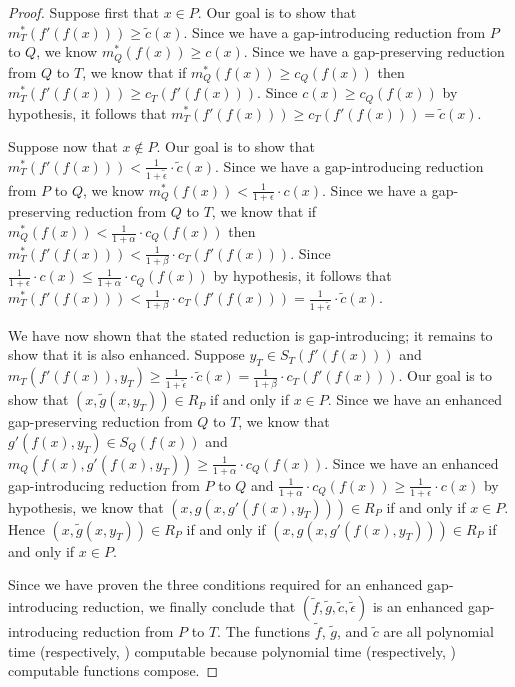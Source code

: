 \documentclass[]{article}
\begin{document}
\begin{proof}
  Suppose first that $x \in P$.
  Our goal is to show that $m^*_T(f'(f(x))) \geq \tilde{c}(x)$.
  Since we have a gap-introducing reduction from $P$ to $Q$, we know $m^*_Q(f(x)) \geq c(x)$.
  Since we have a gap-preserving reduction from $Q$ to $T$, we know that if $m^*_Q(f(x)) \geq c_Q(f(x))$ then $m^*_T(f'(f(x))) \geq c_T(f'(f(x)))$.
  Since $c(x) \geq c_Q(f(x))$ by hypothesis, it follows that $m^*_T(f'(f(x))) \geq c_T(f'(f(x))) = \tilde{c}(x)$.

  Suppose now that $x \notin P$.
  Our goal is to show that $m^*_T(f'(f(x))) < \frac{1}{1 + \tilde{\epsilon}} \cdot \tilde{c}(x)$.
  Since we have a gap-introducing reduction from $P$ to $Q$, we know $m^*_Q(f(x)) < \frac{1}{1 + \epsilon} \cdot c(x)$.
  Since we have a gap-preserving reduction from $Q$ to $T$, we know that if $m^*_Q(f(x)) < \frac{1}{1 + \alpha} \cdot c_Q(f(x))$ then $m^*_T(f'(f(x))) < \frac{1}{1 + \beta} \cdot c_T(f'(f(x)))$.
  Since $\frac{1}{1 + \epsilon} \cdot c(x) \leq \frac{1}{1 + \alpha} \cdot c_Q(f(x))$ by hypothesis, it follows that $m^*_T(f'(f(x))) < \frac{1}{1 + \beta} \cdot c_T(f'(f(x))) = \frac{1}{1 + \tilde{\epsilon}} \cdot \tilde{c}(x)$.

  We have now shown that the stated reduction is gap-introducing; it remains to show that it is also enhanced.
  Suppose $y_T \in S_T(f'(f(x)))$ and $m_T(f'(f(x)), y_T) \geq \frac{1}{1 + \tilde{\epsilon}} \cdot \tilde{c}(x) = \frac{1}{1 + \beta} \cdot c_T(f'(f(x)))$.
  Our goal is to show that $(x, \tilde{g}(x, y_T)) \in R_P$ if and only if $x \in P$.
  Since we have an enhanced gap-preserving reduction from $Q$ to $T$, we know that $g'(f(x), y_T) \in S_Q(f(x))$ and $m_Q(f(x), g'(f(x), y_T)) \geq \frac{1}{1 + \alpha} \cdot c_Q(f(x))$.
  Since we have an enhanced gap-introducing reduction from $P$ to $Q$ and $\frac{1}{1 + \alpha} \cdot c_Q(f(x)) \geq \frac{1}{1 + \epsilon} \cdot c(x)$ by hypothesis, we know that $(x, g(x, g'(f(x), y_T))) \in R_P$ if and only if $x \in P$.
  Hence $(x, \tilde{g}(x, y_T)) \in R_P$ if and only if $(x, g(x, g'(f(x), y_T))) \in R_P$ if and only if $x \in P$.

  Since we have proven the three conditions required for an enhanced gap-introducing reduction, we finally conclude that $(\tilde{f}, \tilde{g}, \tilde{c}, \tilde{\epsilon})$ is an enhanced gap-introducing reduction from $P$ to $T$.
  The functions $\tilde{f}$, $\tilde{g}$, and $\tilde{c}$ are all polynomial time (respectively, \NC) computable because polynomial time (respectively, \NC) computable functions compose.
\end{proof}
\end{document}
